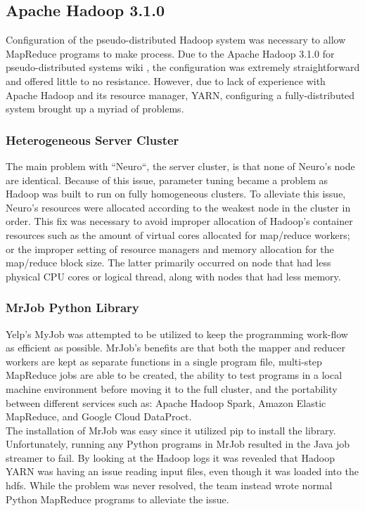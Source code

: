 \documentclass[10pt,journal,compsoc]{IEEEtran}
\begin{document}
\subsection{Apache Hadoop 3.1.0}
Configuration of the pseudo-distributed Hadoop system was necessary to allow MapReduce programs to make process. Due to the Apache Hadoop 3.1.0 for pseudo-distributed systems wiki \cite{HadoopPseudoDistWiki}, the configuration was extremely straightforward and offered little to no resistance. However, due to lack of experience with Apache Hadoop and its resource manager, YARN, configuring a fully-distributed system brought up a myriad of problems.

\subsubsection{Heterogeneous Server Cluster}
The main problem with ``Neuro``, the server cluster, is that none of Neuro's node are identical. Because of this issue, parameter tuning became a problem as Hadoop was built to run on fully homogeneous clusters. To alleviate this issue, Neuro's resources were allocated according to the weakest node in the cluster in order. This fix was necessary to avoid improper allocation of Hadoop's container resources such as the amount of virtual cores allocated for map/reduce workers; or the improper setting of resource managers and memory allocation for the map/reduce block size. The latter primarily occurred on node that had less physical CPU cores or logical thread, along with nodes that had less memory.

\subsubsection{MrJob Python Library}
Yelp's MyJob was attempted to be utilized to keep the programming work-flow as efficient as possible. MrJob's benefits are that both the mapper and reducer workers are kept as separate functions in a single program file, multi-step MapReduce jobs are able to be created, the ability to test programs in a local machine environment before moving it to the full cluster, and the portability between different services such as: Apache Hadoop Spark, Amazon Elastic MapReduce, and Google Cloud DataProct.\\
\indent The installation of MrJob was easy since it utilized pip to install the library. Unfortunately, running any Python programs in MrJob resulted in the Java job streamer to fail. By looking at the Hadoop logs it was revealed that Hadoop YARN was having an issue reading input files, even though it was loaded into the hdfs. While the problem was never resolved, the team instead wrote normal Python MapReduce programs to alleviate the issue.
\end{document}
